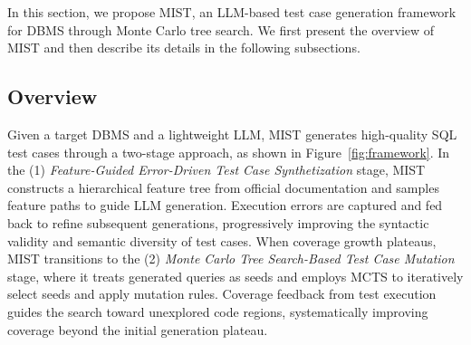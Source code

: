\label{sec:overview}
In this section, we propose MIST, an LLM-based test case generation framework for DBMS through Monte Carlo tree search. We first present the overview of MIST and then describe its details in the following subsections.

\subsection{Overview}

Given a target DBMS and a lightweight LLM, MIST generates high-quality SQL test cases through a two-stage approach, as shown in Figure~\ref{fig:framework}. In the (1) \textit{Feature-Guided Error-Driven Test Case Synthetization} stage, MIST constructs a hierarchical feature tree from official documentation and samples feature paths to guide LLM generation. Execution errors are captured and fed back to refine subsequent generations, progressively improving the syntactic validity and semantic diversity of test cases. When coverage growth plateaus, MIST transitions to the (2) \textit{Monte Carlo Tree Search-Based Test Case Mutation} stage, where it treats generated queries as seeds and employs MCTS to iteratively select seeds and apply mutation rules. Coverage feedback from test execution guides the search toward unexplored code regions, systematically improving coverage beyond the initial generation plateau.






